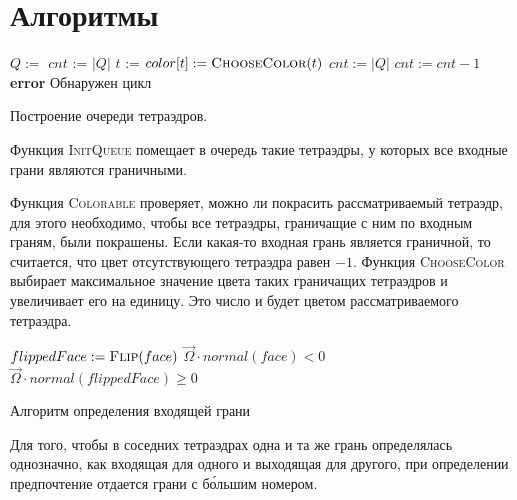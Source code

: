 \chapter{Алгоритмы}

\begin{algorithm}[ht!]
\centering
\begin{algorithmic}[1]
\State $Q := $ 
\State $cnt$ := $|Q|$
\State $t$ := 
\State $color[t] := \Call{ChooseColor}{t}$
\State {}
\EndFor
\State $cnt := |Q|$
\Else
\State {}
\State $cnt := cnt - 1$
\EndIf
{}
\State \textbf{error} Обнаружен цикл
\EndIf
\EndWhile
\EndFunction
\end{algorithmic}
\caption{Построение очереди тетраэдров.}
\label{alg:1}
\end{algorithm}

Функция \textsc{InitQueue} помещает в очередь такие тетраэдры, у которых все входные грани являются граничными.

Функция \textsc{Colorable} проверяет, можно ли покрасить рассматриваемый тетраэдр, для этого необходимо, чтобы все тетраэдры, граничащие с ним по входным граням, были покрашены. Если какая-то входная грань является граничной, то считается, что цвет отсутствующего тетраэдра равен $-1$. Функция \textsc{ChooseColor} выбирает максимальное значение цвета таких граничащих тетраэдров и увеличивает его на единицу. Это число и будет цветом рассматриваемого тетраэдра. 

\begin{algorithm}[ht!]
\centering
\begin{algorithmic}[1]
\State $flippedFace := \Call{Flip}{face}$
\State \Return $\vec \Omega \cdot normal(face) < 0$
\Else 
\State\Return $\vec \Omega \cdot normal(flippedFace) \geqslant 0$
\EndIf
\EndFunction
\end{algorithmic}
\caption{Алгоритм определения входящей грани}
\label{alg:2}
\end{algorithm}

Для того, чтобы в соседних тетраэдрах одна и та же грань определялась однозначно, как входящая для одного и выходящая для другого, при определении предпочтение отдается грани с б\'{о}льшим номером.
